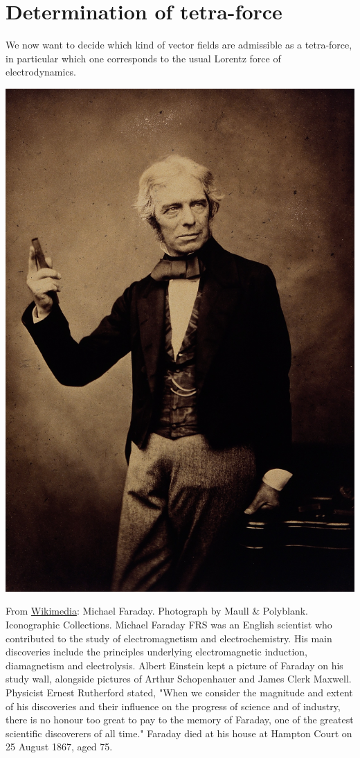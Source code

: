 \documentclass[../main.tex]{subfiles}
\begin{document}
\section{Determination of tetra-force}
We now want to decide which kind of vector fields are admissible as a tetra-force, in particular which one corresponds to the usual Lorentz force of electrodynamics.
\begin{marginfigure}[-50mm]
	\includegraphics[width=1\linewidth]{images/MichaelFaraday.jpg}
	\caption[Michael Faraday. Photograph by Maull \& Polyblank. Iconographic Collections.]{From \href{https://commons.wikimedia.org/wiki/File:Michael\_Faraday.\_Photograph_by_Maull\_\%26\_Polyblank.\_Wellcome\_V0026348.jpg}{Wikimedia}: Michael Faraday. Photograph by Maull \& Polyblank. Iconographic Collections. Michael Faraday FRS was an English scientist who contributed to the study of electromagnetism and electrochemistry. His main discoveries include the principles underlying electromagnetic induction, diamagnetism and electrolysis. Albert Einstein kept a picture of Faraday on his study wall, alongside pictures of Arthur Schopenhauer and James Clerk Maxwell. Physicist Ernest Rutherford stated, "When we consider the magnitude and extent of his discoveries and their influence on the progress of science and of industry, there is no honour too great to pay to the memory of Faraday, one of the greatest scientific discoverers of all time." Faraday died at his house at Hampton Court on 25 August 1867, aged 75.}
\end{marginfigure}
\end{document}
